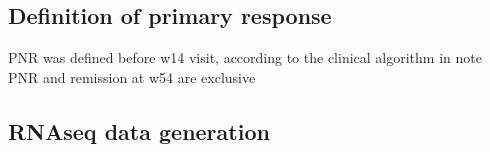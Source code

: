 \begin{outline}
\subsection{Definition of primary response}

\1 PNR was defined before w14 visit, according to the clinical algorithm in \autocite{kennedy2019PredictorsAntiTNFTreatment}
    \2 note PNR and remission at w54 are exclusive


\subsection{RNAseq data generation}


\end{outline}
